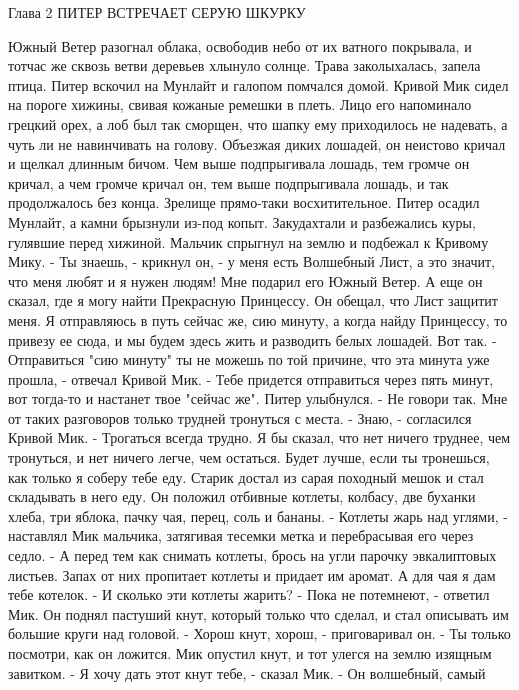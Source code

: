 Глава 2
        ПИТЕР ВСТРЕЧАЕТ СЕРУЮ ШКУРКУ

    Южный Ветер разогнал облака, освободив небо от их ватного 
покрывала, и тотчас же сквозь ветви деревьев хлынуло солнце. Трава 
заколыхалась, запела птица. Питер вскочил на Мунлайт и галопом 
помчался домой. Кривой Мик сидел на пороге хижины, свивая кожаные 
ремешки в плеть. Лицо его напоминало грецкий орех, а лоб был так 
сморщен, что шапку ему приходилось не надевать, а чуть ли не 
навинчивать на голову. Объезжая диких лошадей, он неистово кричал и 
щелкал длинным бичом. Чем выше подпрыгивала лошадь, тем громче он 
кричал, а чем громче кричал он, тем выше подпрыгивала лошадь, и так 
продолжалось без конца. Зрелище прямо-таки восхитительное.
    Питер осадил Мунлайт, а камни брызнули из-под копыт. Закудахтали и 
разбежались куры, гулявшие перед хижиной. Мальчик спрыгнул на землю и 
подбежал к Кривому Мику.
    - Ты знаешь, - крикнул он, - у меня есть Волшебный Лист, а это 
значит, что меня любят и я нужен людям! Мне подарил его Южный Ветер. А 
еще он сказал, где я могу найти Прекрасную Принцессу. Он обещал, что 
Лист защитит меня. Я отправляюсь в путь сейчас же, сию минуту, а когда 
найду Принцессу, то привезу ее сюда, и мы будем здесь жить и разводить 
белых лошадей. Вот так.
    - Отправиться "сию минуту" ты не можешь по той причине, что эта 
минута уже прошла, - отвечал Кривой Мик. - Тебе придется отправиться 
через пять минут, вот тогда-то и настанет твое "сейчас же".
    Питер улыбнулся.
    - Не говори так. Мне от таких разговоров только трудней тронуться 
с места.
    - Знаю, - согласился Кривой Мик. - Трогаться всегда трудно. Я бы 
сказал, что нет ничего труднее, чем тронуться, и нет ничего легче, чем 
остаться. Будет лучше, если ты тронешься, как только я соберу тебе 
еду.
    Старик достал из сарая походный мешок и стал складывать в него 
еду. Он положил отбивные котлеты, колбасу, две буханки хлеба, три 
яблока, пачку чая, перец, соль и бананы.
    - Котлеты жарь над углями, - наставлял Мик мальчика, затягивая 
тесемки метка и перебрасывая его через седло. - А перед тем как 
снимать котлеты, брось на угли парочку эвкалиптовых листьев. Запах от 
них пропитает котлеты и придает им аромат. А для чая я дам тебе 
котелок.
    - И сколько эти котлеты жарить?
    - Пока не потемнеют, - ответил Мик. Он поднял пастуший кнут, 
который только что сделал, и стал описывать им большие круги над 
головой. - Хорош кнут, хорош, - приговаривал он. - Ты только посмотри, 
как он ложится.
    Мик опустил кнут, и тот улегся на землю изящным завитком.
    - Я хочу дать этот кнут тебе, - сказал Мик. - Он волшебный, самый 
